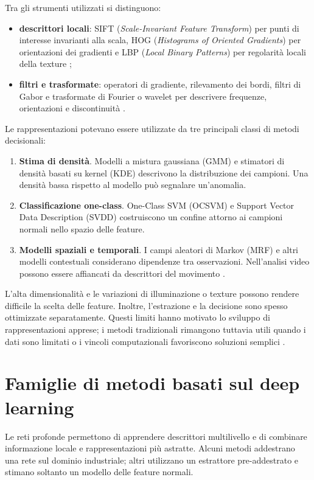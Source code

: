 Tra gli strumenti utilizzati si distinguono:
\begin{itemize}
    \item \textbf{descrittori locali}: SIFT (\textit{Scale-Invariant Feature Transform}) per punti di interesse invarianti alla scala, HOG (\textit{Histograms of Oriented Gradients}) per orientazioni dei gradienti e LBP (\textit{Local Binary Patterns}) per regolarità locali della texture \cite{Yang_et_al._2021,Cui_et_al._2023};
    \item \textbf{filtri e trasformate}: operatori di gradiente, rilevamento dei bordi, filtri di Gabor e trasformate di Fourier o wavelet per descrivere frequenze, orientazioni e discontinuità \cite{Cui_et_al._2023}.
\end{itemize}

Le rappresentazioni potevano essere utilizzate da tre principali classi di metodi decisionali:
\begin{enumerate}
    \item \textbf{Stima di densità}. Modelli a mistura gaussiana (GMM) e stimatori di densità basati su kernel (KDE) descrivono la distribuzione dei campioni. Una densità bassa rispetto al modello può segnalare un'anomalia.
    \item \textbf{Classificazione one-class}. One-Class SVM (OCSVM) e Support Vector Data Description (SVDD) costruiscono un confine attorno ai campioni normali nello spazio delle feature.
    \item \textbf{Modelli spaziali e temporali}. I campi aleatori di Markov (MRF) e altri modelli contestuali considerano dipendenze tra osservazioni. Nell'analisi video possono essere affiancati da descrittori del movimento \cite{Tran_et_al._2022}.
\end{enumerate}

L'alta dimensionalità e le variazioni di illuminazione o texture possono rendere difficile la scelta delle feature. Inoltre, l'estrazione e la decisione sono spesso ottimizzate separatamente. Questi limiti hanno motivato lo sviluppo di rappresentazioni apprese; i metodi tradizionali rimangono tuttavia utili quando i dati sono limitati o i vincoli computazionali favoriscono soluzioni semplici \cite{Yang_et_al._2021}.

\section{Famiglie di metodi basati sul deep learning}

Le reti profonde permettono di apprendere descrittori multilivello e di combinare informazione locale e rappresentazioni più astratte. Alcuni metodi addestrano una rete sul dominio industriale; altri utilizzano un estrattore pre-addestrato e stimano soltanto un modello delle feature normali.

